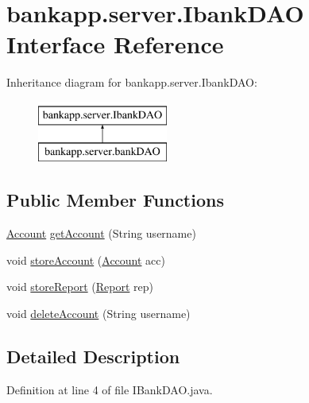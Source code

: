 \hypertarget{interfacebankapp_1_1server_1_1_ibank_d_a_o}{}\section{bankapp.\+server.\+Ibank\+D\+AO Interface Reference}
\label{interfacebankapp_1_1server_1_1_ibank_d_a_o}
Inheritance diagram for bankapp.\+server.\+Ibank\+D\+AO\+:\begin{figure}[H]
\begin{center}
\leavevmode
\includegraphics[height=2.000000cm]{interfacebankapp_1_1server_1_1_ibank_d_a_o}
\end{center}
\end{figure}
\subsection*{Public Member Functions}
\begin{DoxyCompactItemize}
\item 
\hyperlink{classbankapp_1_1server_1_1_account}{Account} \hyperlink{interfacebankapp_1_1server_1_1_ibank_d_a_o_af0e84b74c8826ce5fb80a156bc19e488}{get\+Account} (String username)
\item 
void \hyperlink{interfacebankapp_1_1server_1_1_ibank_d_a_o_a6631fb11c78a48b05a743e4f7f2757ef}{store\+Account} (\hyperlink{classbankapp_1_1server_1_1_account}{Account} acc)
\item 
void \hyperlink{interfacebankapp_1_1server_1_1_ibank_d_a_o_a8990d1f4e0ffb741d459cebe172e47e0}{store\+Report} (\hyperlink{classbankapp_1_1server_1_1_report}{Report} rep)
\item 
void \hyperlink{interfacebankapp_1_1server_1_1_ibank_d_a_o_a618b28f4d950f4d2705745c13d7be470}{delete\+Account} (String username)
\end{DoxyCompactItemize}


\subsection{Detailed Description}


Definition at line 4 of file I\+Bank\+D\+A\+O.\+java.




